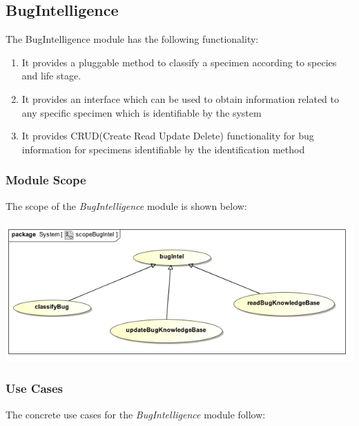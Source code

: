 \documentclass[11pt,a4paper,titlepage]{article}
\begin{document}
		
	
	\subsection{BugIntelligence}
		The BugIntelligence module has the following functionality:
		\begin{enumerate}		
			\item It provides a pluggable method to classify a specimen according to species and life stage.
			\item It provides an interface which can be used to obtain information related to any specific specimen which is identifiable by the system
			\item It provides CRUD(Create Read Update Delete) functionality for bug information for specimens identifiable by the identification method
		\end{enumerate}
		\subsubsection{Module Scope}
		The scope of the \textit{BugIntelligence} module is shown below:\\
		\hfill\\
		\includegraphics[width=\linewidth]{scopeBugIntel}
		\subsubsection{Use Cases}
		The concrete use cases for the \textit{BugIntelligence} module follow:
		
\end{document}
